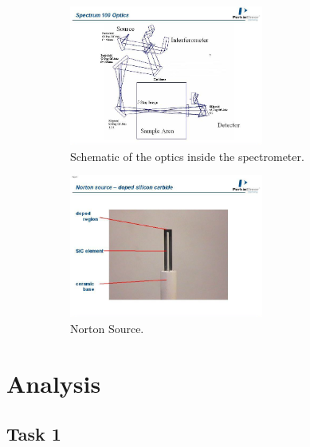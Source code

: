 \documentclass{article}
\begin{document}
\begin{figure}[h]
	\begin{subfigure}[t]{0.48\textwidth}
    	\centering
    	\includegraphics[width=0.7\textwidth]{Figures/Introduction/Schematic1.png}
    	\caption{Schematic of the optics inside the spectrometer. \cite{riede_rotationvibration}}
    	\label{fig:spectrometer_optics}
	\end{subfigure}
	\begin{subfigure}[t]{0.48\textwidth}
		\centering
		\includegraphics[width=0.7\textwidth]{Figures/Introduction/Schematic2.png}
		\caption{Norton Source.}
		\label{fig:nortonsource}
	\end{subfigure}
	\caption{}
\end{figure}


\pagebreak{}


\section{Analysis}

\subsection{Task 1}
\end{document}
